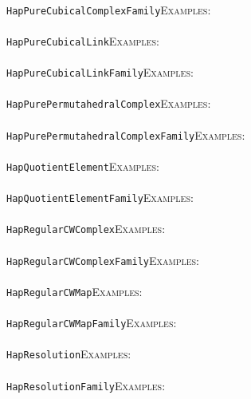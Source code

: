 \documentclass[a4paper,11pt]{report}
\begin{document}
{{ \\
 \texttt{HapPureCubicalComplexFamily}{\nobreakspace}{\nobreakspace}{\nobreakspace}{\nobreakspace}\textsc{Examples:} \\
 \\
 \texttt{HapPureCubicalLink}{\nobreakspace}{\nobreakspace}{\nobreakspace}{\nobreakspace}\textsc{Examples:} \\
 \\
 \texttt{HapPureCubicalLinkFamily}{\nobreakspace}{\nobreakspace}{\nobreakspace}{\nobreakspace}\textsc{Examples:} \\
 \\
 \texttt{HapPurePermutahedralComplex}{\nobreakspace}{\nobreakspace}{\nobreakspace}{\nobreakspace}\textsc{Examples:} \\
 \\
 \texttt{HapPurePermutahedralComplexFamily}{\nobreakspace}{\nobreakspace}{\nobreakspace}{\nobreakspace}\textsc{Examples:} \\
 \\
 \texttt{HapQuotientElement}{\nobreakspace}{\nobreakspace}{\nobreakspace}{\nobreakspace}\textsc{Examples:} \\
 \\
 \texttt{HapQuotientElementFamily}{\nobreakspace}{\nobreakspace}{\nobreakspace}{\nobreakspace}\textsc{Examples:} \\
 \\
 \texttt{HapRegularCWComplex}{\nobreakspace}{\nobreakspace}{\nobreakspace}{\nobreakspace}\textsc{Examples:} \\
 \\
 \texttt{HapRegularCWComplexFamily}{\nobreakspace}{\nobreakspace}{\nobreakspace}{\nobreakspace}\textsc{Examples:} \\
 \\
 \texttt{HapRegularCWMap}{\nobreakspace}{\nobreakspace}{\nobreakspace}{\nobreakspace}\textsc{Examples:} \\
 \\
 \texttt{HapRegularCWMapFamily}{\nobreakspace}{\nobreakspace}{\nobreakspace}{\nobreakspace}\textsc{Examples:} \\
 \\
 \texttt{HapResolution}{\nobreakspace}{\nobreakspace}{\nobreakspace}{\nobreakspace}\textsc{Examples:} \\
 \\
 \texttt{HapResolutionFamily}{\nobreakspace}{\nobreakspace}{\nobreakspace}{\nobreakspace}\textsc{Examples:} \\
 \\
}}
\end{document}
